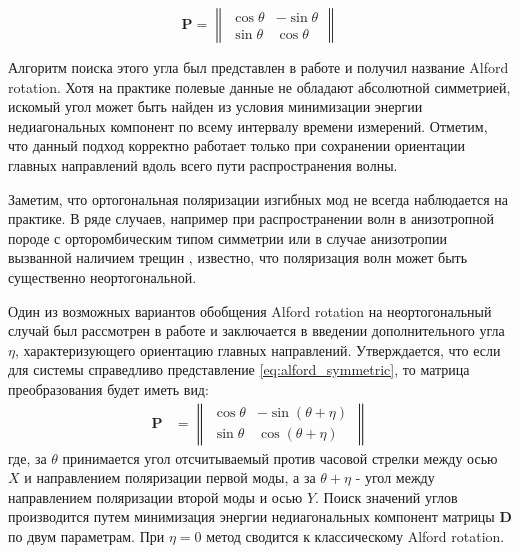 \documentclass[a4paper,11pt]{article}
\begin{document}
\begin{equation*}
	\mathbf{P} = \left\|
	\begin{array}{cc}
	\cos \theta &-\sin \theta \\ 
	\sin \theta & \cos \theta
	\end{array} 
	\right\| 
\end{equation*}

Алгоритм поиска этого угла был представлен в работе \cite{Alford1986} и получил название Alford rotation. Хотя на практике полевые данные не обладают абсолютной симметрией, искомый угол может быть найден из условия минимизации энергии недиагональных компонент по всему интервалу времени измерений. Отметим, что данный подход корректно работает только при сохранении ориентации главных направлений вдоль всего пути распространения волны.

Заметим, что ортогональная поляризации изгибных мод не всегда наблюдается на практике. В ряде случаев, например при распространении волн в анизотропной породе с орторомбическим типом симметрии \cite{Dellinger2001} или в случае анизотропии вызванной наличием трещин \cite{Nolte1996}, известно, что поляризация волн может быть существенно неортогональной. 

Один из возможных вариантов обобщения Alford rotation на неортогональный случай был рассмотрен в работе \cite{Dellinger1998} и заключается в введении дополнительного угла $\eta$, характеризующего ориентацию главных направлений. Утверждается, что если для системы справедливо представление \eqref{eq:alford_symmetric}, то матрица преобразования будет иметь вид:
\begin{align*}
\mathbf{P} &= \left\|
\begin{array}{cc}
\cos \theta & -\sin (\theta+\eta) \\ 
\sin \theta & \cos (\theta+\eta)
\end{array} 
\right\|
\end{align*}
где, за $\theta$ принимается угол отсчитываемый против часовой стрелки между осью $X$ и направлением поляризации первой моды, а за $\theta + \eta$ - угол между направлением поляризации второй моды и осью $Y$. Поиск значений углов производится путем минимизация энергии недиагональных компонент матрицы $\mathbf{D}$ по двум параметрам. При $\eta=0$ метод сводится к классическому Alford rotation. 
\end{document}
